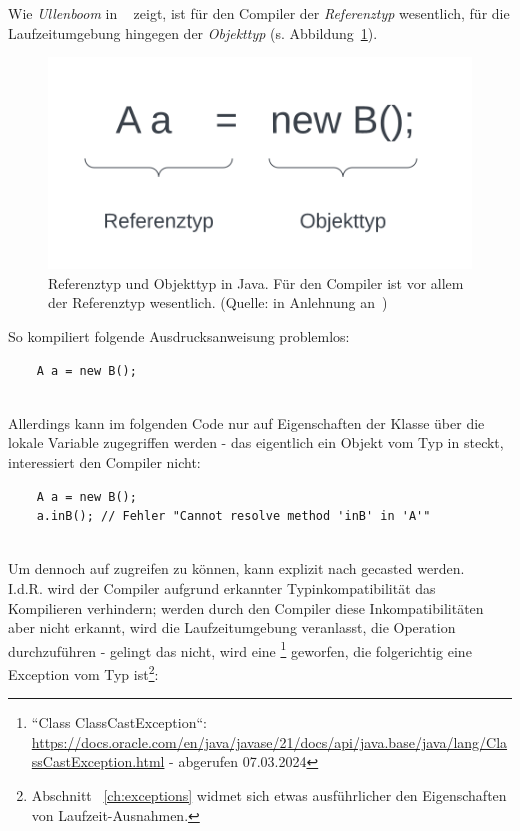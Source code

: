 Wie \textit{Ullenboom} in ~\cite[467 f.]{Ull23} zeigt, ist für den Compiler der \textit{Referenztyp} wesentlich, für die Laufzeitumgebung hingegen der \textit{Objekttyp} (s. Abbildung~\ref{fig:types}).\\

\begin{figure}
    \begin{center}
        \includegraphics[scale=0.5]{chapters/OOP/img/types}
        \caption{Referenztyp und Objekttyp in Java. Für den Compiler ist vor allem der Referenztyp wesentlich. (Quelle: in Anlehnung an~\cite[467 f., ``Begrifflichkeit``]{Ull23})}
        \label{fig:types}
    \end{center}
\end{figure}

\noindent
So kompiliert folgende Ausdrucksanweisung problemlos:

\begin{verbatim}
    A a = new B();
\end{verbatim}\\

\noindent
Allerdings kann im folgenden Code nur auf Eigenschaften der Klasse  über die lokale Variable  zugegriffen werden - das eigentlich ein Objekt vom Typ  in  steckt, interessiert den Compiler nicht:\\

\begin{verbatim}
    A a = new B();
    a.inB(); // Fehler "Cannot resolve method 'inB' in 'A'"
\end{verbatim}\\


\noindent
Um dennoch auf  zugreifen zu können, kann  explizit nach  gecasted werden.\\
\noindent
I.d.R. wird der Compiler aufgrund erkannter Typinkompatibilität das Kompilieren verhindern; werden durch den Compiler diese Inkompatibilitäten aber nicht erkannt, wird die Laufzeitumgebung veranlasst, die Operation durchzuführen - gelingt das nicht, wird eine \footnote{
``Class ClassCastException``: \url{https://docs.oracle.com/en/java/javase/21/docs/api/java.base/java/lang/ClassCastException.html} - abgerufen 07.03.2024
} geworfen, die folgerichtig eine Exception vom Typ  ist\footnote{
Abschnitt ~\ref{ch:exceptions} widmet sich etwas ausführlicher den Eigenschaften von Laufzeit-Ausnahmen.
}:

